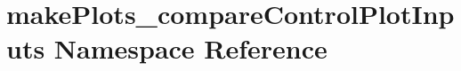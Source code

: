 \hypertarget{namespacemakePlots__compareControlPlotInputs}{
\section{makePlots\_\-compareControlPlotInputs Namespace Reference}
\label{namespacemakePlots__compareControlPlotInputs}
}
